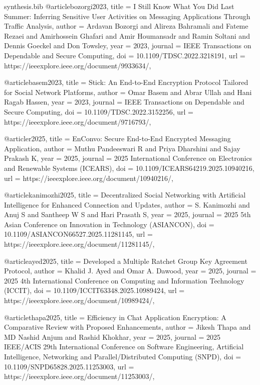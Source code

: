 \begin{filecontents*}{synthesis.bib}
@article{bozorgi2023,
  title = {I Still Know What You Did Last Summer: Inferring Sensitive User Activities on Messaging Applications Through Traffic Analysis},
  author = {Ardavan Bozorgi and Alireza Bahramali and Fateme Rezaei and Amirhossein Ghafari and Amir Houmansadr and Ramin Soltani and Dennis Goeckel and Don Towsley},
  year = {2023},
  journal = {IEEE Transactions on Dependable and Secure Computing},
  doi = {10.1109/TDSC.2022.3218191},
  url = {https://ieeexplore.ieee.org/document/9933634/},
}

@article{basem2023,
  title = {Stick: An End-to-End Encryption Protocol Tailored for Social Network Platforms},
  author = {Omar Basem and Abrar Ullah and Hani Ragab Hassen},
  year = {2023},
  journal = {IEEE Transactions on Dependable and Secure Computing},
  doi = {10.1109/TDSC.2022.3152256},
  url = {https://ieeexplore.ieee.org/document/9716793/},
}

@article{r2025,
  title = {EnConvo: Secure End-to-End Encrypted Messaging Application},
  author = {Muthu Pandeeswari R and Priya Dharshini and Sajay Prakash K},
  year = {2025},
  journal = {2025 International Conference on Electronics and Renewable Systems (ICEARS)},
  doi = {10.1109/ICEARS64219.2025.10940216},
  url = {https://ieeexplore.ieee.org/document/10940216/},
}

@article{kanimozhi2025,
  title = {Decentralized Social Networking with Artificial Intelligence for Enhanced Connection and Updates},
  author = {S. Kanimozhi and Anuj S and Santheep W S and Hari Prasath S},
  year = {2025},
  journal = {2025 5th Asian Conference on Innovation in Technology (ASIANCON)},
  doi = {10.1109/ASIANCON66527.2025.11281145},
  url = {https://ieeexplore.ieee.org/document/11281145/},
}

@article{ayed2025,
  title = {Developed a Multiple Ratchet Group Key Agreement Protocol},
  author = {Khalid J. Ayed and Omar A. Dawood},
  year = {2025},
  journal = {2025 4th International Conference on Computing and Information Technology (ICCIT)},
  doi = {10.1109/ICCIT63348.2025.10989424},
  url = {https://ieeexplore.ieee.org/document/10989424/},
}

@article{thapa2025,
  title = {Efficiency in Chat Application Encryption: A Comparative Review with Proposed Enhancements},
  author = {Jikesh Thapa and MD Nashid Anjum and Rashid Khokhar},
  year = {2025},
  journal = {2025 IEEE/ACIS 29th International Conference on Software Engineering, Artificial Intelligence, Networking and Parallel/Distributed Computing (SNPD)},
  doi = {10.1109/SNPD65828.2025.11253003},
  url = {https://ieeexplore.ieee.org/document/11253003/},
}


\end{filecontents*}
